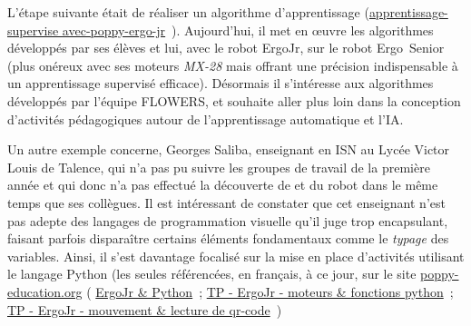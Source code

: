             L'étape suivante était de réaliser un algorithme d'apprentissage (\cf \href{https://forum.poppy-project.org/t/apprentissage-supervise-avec-poppy-ergo-jr/3427}{apprentissage-supervise avec-poppy-ergo-jr}~). Aujourd'hui, il met en œuvre les algorithmes développés par ses élèves et lui, avec le robot ErgoJr, sur le robot Ergo~Senior (plus onéreux avec ses moteurs \textit{MX-28} mais offrant une précision indispensable à un apprentissage supervisé efficace). Désormais il s'intéresse aux algorithmes développés par l'équipe FLOWERS, et souhaite aller plus loin dans la conception d'activités pédagogiques autour de l'apprentissage automatique et l'IA.\par%
            Un autre exemple concerne, Georges Saliba, enseignant en ISN au Lycée Victor Louis de Talence, qui n'a pas pu suivre les groupes de travail de la première année et qui donc n'a pas effectué la découverte de  et du robot dans le même temps que ses collègues. Il est intéressant de constater que cet enseignant n'est pas adepte des langages de programmation visuelle qu'il juge trop encapsulant, faisant parfois disparaître certains éléments fondamentaux comme le \textit{typage} des variables. Ainsi, il s'est davantage focalisé sur la mise en place d'activités utilisant le langage Python (les seules référencées, en français, à ce jour, sur le site \href{http://www.poppy-education.org}{poppy-education.org} (\cf 
            \href{https://www.poppy-education.org/2016/04/19/tuto-ergojr-python/}{ErgoJr \& Python}~; 
            \href{https://www.poppy-education.org/2016/04/19/tp-ergo-jr-moteurs-et-fonctions/}{TP - ErgoJr - moteurs \& fonctions python}~; 
            \href{https://www.poppy-education.org/2016/04/19/tp-ergo-jr-mouvement-et-lecture-qr-code/}{TP - ErgoJr - mouvement \& lecture de qr-code}~)\par%

